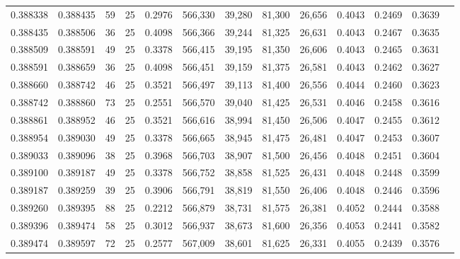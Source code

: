 \begin{tabular}{rrrrrrrrrrrrr}
0.388338 & 0.388435 &    59 &  25 &                                     0.2976 & 566,330 &  39,280 &  81,300 &  26,656 & 0.4043 & 0.2469 & 0.3639 \\
0.388435 & 0.388506 &    36 &  25 &                                     0.4098 & 566,366 &  39,244 &  81,325 &  26,631 & 0.4043 & 0.2467 & 0.3635 \\
0.388509 & 0.388591 &    49 &  25 &                                     0.3378 & 566,415 &  39,195 &  81,350 &  26,606 & 0.4043 & 0.2465 & 0.3631 \\
0.388591 & 0.388659 &    36 &  25 &                                     0.4098 & 566,451 &  39,159 &  81,375 &  26,581 & 0.4043 & 0.2462 & 0.3627 \\
0.388660 & 0.388742 &    46 &  25 &                                     0.3521 & 566,497 &  39,113 &  81,400 &  26,556 & 0.4044 & 0.2460 & 0.3623 \\
0.388742 & 0.388860 &    73 &  25 &                                     0.2551 & 566,570 &  39,040 &  81,425 &  26,531 & 0.4046 & 0.2458 & 0.3616 \\
0.388861 & 0.388952 &    46 &  25 &                                     0.3521 & 566,616 &  38,994 &  81,450 &  26,506 & 0.4047 & 0.2455 & 0.3612 \\
0.388954 & 0.389030 &    49 &  25 &                                     0.3378 & 566,665 &  38,945 &  81,475 &  26,481 & 0.4047 & 0.2453 & 0.3607 \\
0.389033 & 0.389096 &    38 &  25 &                                     0.3968 & 566,703 &  38,907 &  81,500 &  26,456 & 0.4048 & 0.2451 & 0.3604 \\
0.389100 & 0.389187 &    49 &  25 &                                     0.3378 & 566,752 &  38,858 &  81,525 &  26,431 & 0.4048 & 0.2448 & 0.3599 \\
0.389187 & 0.389259 &    39 &  25 &                                     0.3906 & 566,791 &  38,819 &  81,550 &  26,406 & 0.4048 & 0.2446 & 0.3596 \\
0.389260 & 0.389395 &    88 &  25 &                                     0.2212 & 566,879 &  38,731 &  81,575 &  26,381 & 0.4052 & 0.2444 & 0.3588 \\
0.389396 & 0.389474 &    58 &  25 &                                     0.3012 & 566,937 &  38,673 &  81,600 &  26,356 & 0.4053 & 0.2441 & 0.3582 \\
0.389474 & 0.389597 &    72 &  25 &                                     0.2577 & 567,009 &  38,601 &  81,625 &  26,331 & 0.4055 & 0.2439 & 0.3576 \\

\end{tabular}
